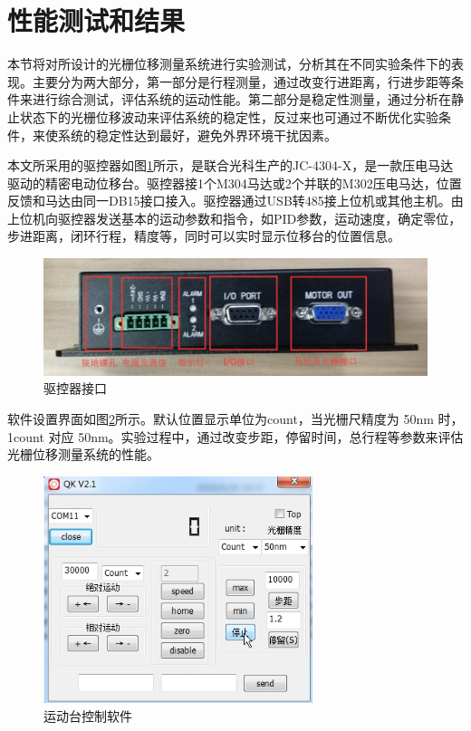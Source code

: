\documentclass[type=master,oneside]{fduthesis}
\begin{document}
\section{性能测试和结果}
本节将对所设计的光栅位移测量系统进行实验测试，分析其在不同实验条件下的表现。主要分为两大部分，第一部分是行程测量，通过改变行进距离，行进步距等条件来进行综合测试，评估系统的运动性能。第二部分是稳定性测量，通过分析在静止状态下的光栅位移波动来评估系统的稳定性，反过来也可通过不断优化实验条件，来使系统的稳定性达到最好，避免外界环境干扰因素。

本文所采用的驱控器如图\ref{fig:驱控器接口}所示，是联合光科生产的JC-4304-X，是一款压电马达驱动的精密电动位移台。驱控器接1个M304马达或2个并联的M302压电马达，位置反馈和马达由同一DB15接口接入。驱控器通过USB转485接上位机或其他主机。由上位机向驱控器发送基本的运动参数和指令，如PID参数，运动速度，确定零位，步进距离，闭环行程，精度等，同时可以实时显示位移台的位置信息。
\begin{figure}[H]
  \centering
  \includegraphics[width=1\textwidth]{4-fig//驱控器接口.png}
  \caption{驱控器接口}
  \label{fig:驱控器接口}
\end{figure}

软件设置界面如图\ref{fig:运动台控制软件}所示。默认位置显示单位为count，当光栅尺精度为 50nm 时，1count 对应 50nm。实验过程中，通过改变步距，停留时间，总行程等参数来评估光栅位移测量系统的性能。
\begin{figure}[H]
  \centering
  \includegraphics[width=0.7\textwidth]{4-fig//运动台控制软件.png}
  \caption{运动台控制软件}
  \label{fig:运动台控制软件}
\end{figure}
\end{document}
